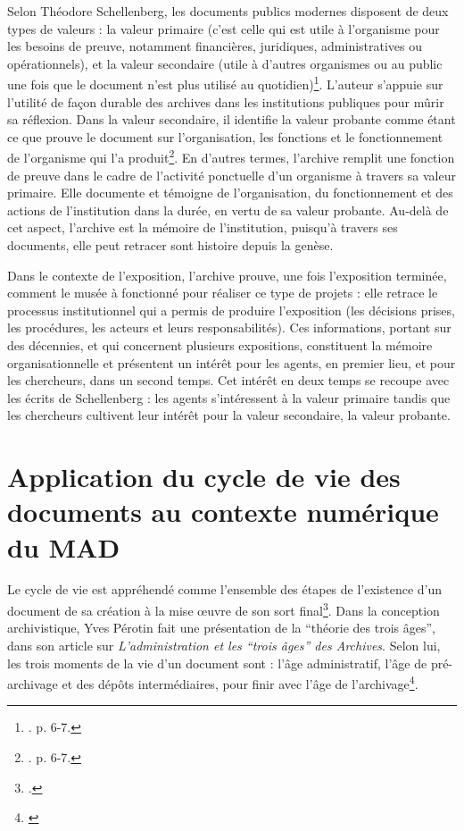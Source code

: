Selon Théodore Schellenberg, les documents publics modernes disposent de deux types de valeurs : la valeur primaire (c'est celle qui est utile à l'organisme pour les besoins de preuve, notamment financières, juridiques, administratives ou opérationnels), et la valeur secondaire (utile à d'autres organismes ou au public une fois que le document n'est plus utilisé au quotidien)\footnote{\cite{schellenberg-appraisal-1956}. p. 6-7. }. L'auteur s'appuie sur l'utilité de façon durable des archives dans les institutions publiques pour mûrir sa réflexion. Dans la valeur secondaire, il identifie la valeur probante comme étant ce que prouve le document sur l'organisation, les fonctions et le fonctionnement de l'organisme qui l'a produit\footnote{\cite{schellenberg-appraisal-1956}. p. 6-7. }. En d'autres termes, l'archive remplit une fonction de preuve dans le cadre de l'activité ponctuelle d'un organisme à travers sa valeur primaire. Elle documente et témoigne de l'organisation, du fonctionnement et des actions de l’institution dans la durée, en vertu de sa valeur probante. Au-delà de cet aspect, l'archive est la mémoire de l'institution, puisqu'à travers ses documents, elle peut retracer sont histoire depuis la genèse.

Dans le contexte de l'exposition, l'archive prouve, une fois l'exposition terminée, comment le musée à fonctionné pour réaliser ce type de projets : elle retrace le processus institutionnel qui a permis de produire l'exposition (les décisions prises, les procédures, les acteurs et leurs responsabilités). Ces informations, portant sur des décennies, et qui concernent plusieurs expositions, constituent la mémoire organisationnelle et présentent un intérêt pour les agents, en premier lieu, et pour les chercheurs, dans un second temps. Cet intérêt en deux temps se recoupe avec les écrits de Schellenberg : les agents s’intéressent à la valeur primaire tandis que les chercheurs cultivent leur intérêt pour la valeur secondaire, la valeur probante. 

\section{Application du cycle de vie des documents au contexte numérique du MAD}

Le cycle de vie est appréhendé comme l'ensemble des étapes de l'existence d'un document de sa création à la mise œuvre de son sort final\footnote{\cite{kern-holgado-cottin-2015}.}. Dans la conception archivistique, Yves Pérotin fait une présentation de la \enquote{théorie des trois âges}, dans son article sur \textit{L'administration et les \enquote{trois âges} des Archives}. Selon lui, les trois moments de la vie d'un document sont : l'âge administratif, l'âge de pré-archivage et des dépôts intermédiaires, pour finir avec l'âge de l'archivage\footnote{\cite{perotin-administration-1961}}.

